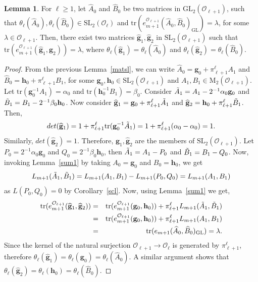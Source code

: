 \documentclass[10pt,twoside]{amsart}
\newcommand{\GL}{\mathrm{GL}}
\newcommand{\SL}{\mathrm{SL}}
\newcommand{\tr}{\mathrm{tr}}
\newcommand{\M}{\mathrm{M}}
\theoremstyle{definition}
\theoremstyle{definition}
\newtheorem{lemma}[theorem]{Lemma}
\begin{document}
\begin{lemma}{\label{lem: trace GL to trace SL}}
For $\ell\geq 1$, let $\widehat{A}_0$ and $\widehat{B}_0$ be two matrices in $\GL_2(\mathcal{O}_{\ell+1})$, such that $\theta_{\ell}(\widehat{A}_0), \theta_{\ell}(\widehat{B}_0)\in \SL_2(\mathcal{O}_{\ell})$ and $\tr(e_{m+1}^{\mathcal{O}_{\ell+1}}(\widehat{A}_0, \widehat{B}_0)_{\GL}) = \lambda$, for some $\lambda \in \mathcal{O}_{\ell + 1}$. Then, there exist two matrices $\widehat{\mathbf{g}}_1, \widehat{\mathbf{g}}_2$ in $\SL_2(\mathcal{O}_{\ell + 1})$ such that $\tr(e_{m+1}^{\mathcal{O}_{\ell + 1}}(\widehat{\mathbf{g}}_1, \widehat{\mathbf{g}}_2)) = \lambda$, where $\theta_{\ell}(\widehat{\mathbf{g}}_1) = \theta_{\ell}(\widehat{A}_0)$ and $\theta_{\ell}(\widehat{\mathbf{g}}_2) = \theta_{\ell}(\widehat{B}_0)$.
\end{lemma}
\begin{proof}
From the previous Lemma~\ref{matsl}, we can write $\widehat{A}_0 = \mathbf{g}_0 + \pi_{\ell+1}^{\ell} A_1$ and $\widehat{B}_0 = \mathbf{h}_0 + \pi_{\ell+1}^{\ell} B_1$, for some $\mathbf{g}_0, \mathbf{h}_0 \in \SL_2(\mathcal{O}_{\ell+1})$ and $A_1, B_1\in \M_2(\mathcal{O}_{\ell+1})$. Let $\tr(\mathbf{g}_0^{-1}A_1) = \alpha_0$ and $\tr(\mathbf{h}_0^{-1}B_1) = \beta_0$. Consider $\Tilde{A}_1 = A_1 - 2^{-1}\alpha_0\mathbf{g}_0$ and $\Tilde{B}_1 = B_1 - 2^{-1}\beta_0\mathbf{h}_0$. Now consider $\widehat{\mathbf{g}}_1 = \mathbf{g}_0 + \pi_{\ell+1}^{\ell} \Tilde{A}_1$ and $\widehat{\mathbf{g}}_2 = \mathbf{h}_0 + \pi_{\ell+1}^{\ell} \Tilde{B}_1$. Then, $$det(\widehat{\mathbf{g}}_1) = 1+\pi_{{\ell}+1}^{\ell} \tr(\mathbf{g}_0^{-1}\Tilde{A}_1) = 1 + \pi_{\ell+1}^{\ell}(\alpha_0-\alpha_0) = 1.$$ Similarly, $det(\widehat{\mathbf{g}}_2) = 1$. Therefore, $\widehat{\mathbf{g}}_1, \widehat{\mathbf{g}}_2$ are the members of $\SL_2(\mathcal{O}_{\ell + 1})$. Let $P_0 = 2^{-1} \alpha_0 \mathbf{g}_0$ and $Q_0 = 2^{-1} \beta_0 \mathbf{h}_0$, then $\Tilde{A}_1 = A_1 - P_0$ and $\Tilde{B}_1 = B_1 - Q_0$. Now, invoking Lemma~\ref{sum1} by taking $A_0 = \mathbf{g}_0$ and $B_0=\mathbf{h}_0$, we get 
$$L_{m+1}(\Tilde{A}_1, \Tilde{B}_1) = L_{m+1}(A_1, B_1) - L_{m+1}(P_0, Q_0) = L_{m+1}(A_1, B_1)$$ 
as $L(P_0,Q_0)=0$ by Corollary~\ref{scl}. Now, using Lemma~\ref{sum1} we get, 
\begin{eqnarray*}
\tr(e_{m+1}^{\mathcal{O}_{\ell+1}}(\widehat{\mathbf{g}}_1, \widehat{\mathbf{g}}_2)) &= & \tr(e_{m+1}^{\mathcal{O}_{\ell+1}}(\mathbf{g}_0, \mathbf{h}_0)) + \pi_{\ell+1}^{\ell} L_{m+1}(\Tilde{A}_1, \Tilde{B}_1) \\
&=& \tr(e_{m+1}^{\mathcal{O}_{\ell + 1}}(\mathbf{g}_0, \mathbf{h}_0)) + \pi_{\ell + 1}^{\ell} L_{m+1}(A_1, B_1) \\
&=& \tr(e_{m+1}(\widehat{A}_0, \widehat{B}_0)_{\GL})=\lambda.
\end{eqnarray*}
Since the kernel of the natural surjection $\mathcal{O}_{\ell+1} \rightarrow \mathcal{O}_{\ell}$ is generated by $\pi_{\ell+1}^{\ell}$, therefore $\theta_{\ell}(\widehat{\mathbf{g}}_1) = \theta_{\ell}(\mathbf{g}_0) = \theta_{\ell}(\widehat{A}_0)$. A similar argument shows that $\theta_{\ell}(\widehat{\mathbf{g}}_2) = \theta_{\ell}(\mathbf{h}_0) = \theta_{\ell}(\widehat{B}_0)$.
\end{proof}
\end{document}
